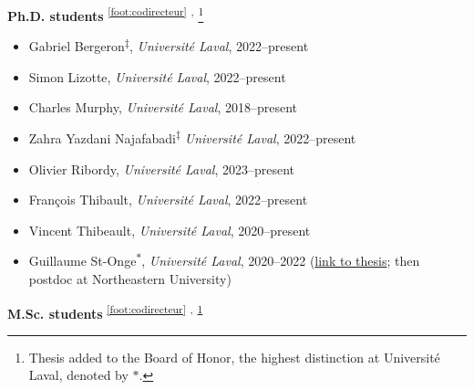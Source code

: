\documentclass[11pt]{article}
\begin{document}
%
%
%
\textbf{Ph.D. students}%
\textsuperscript{\ref{foot:codirecteur}}%
\textsuperscript{,}%
\footnote{\label{foot:tableau}Thesis added to the Board of Honor, the highest distinction at Université Laval, denoted by $\ast$.}
%
\begin{itemize}
  \item Gabriel Bergeron\textsuperscript{$\ddagger$}, \textit{Universit\'e Laval}, 2022--present
  \item Simon Lizotte, \textit{Universit\'e Laval}, 2022--present
  \item Charles Murphy, \textit{Universit\'e Laval}, 2018--present%
  \item Zahra Yazdani Najafabadi\textsuperscript{$\ddagger$} \textit{Université Laval}, 2022--present
  \item Olivier Ribordy, \textit{Universit\'e Laval}, 2023--present
  \item Fran\c{c}ois Thibault, \textit{Universit\'e Laval}, 2022--present
  \item Vincent Thibeault, \textit{Université Laval}, 2020--present
  \item Guillaume St-Onge\textsuperscript{$\ast$}, \textit{Université Laval}, 2020--2022 {\small(\href{http://antoineallard.github.io/files/theses/StOnge.2022.PhD.pdf}{link to thesis}; then postdoc at Northeastern University)}
\end{itemize}
%
%
%
\textbf{M.Sc. students}%
%
\textsuperscript{\ref{foot:codirecteur}}%
\textsuperscript{,}%
\textsuperscript{\ref{foot:tableau}}%
%
\end{document}
